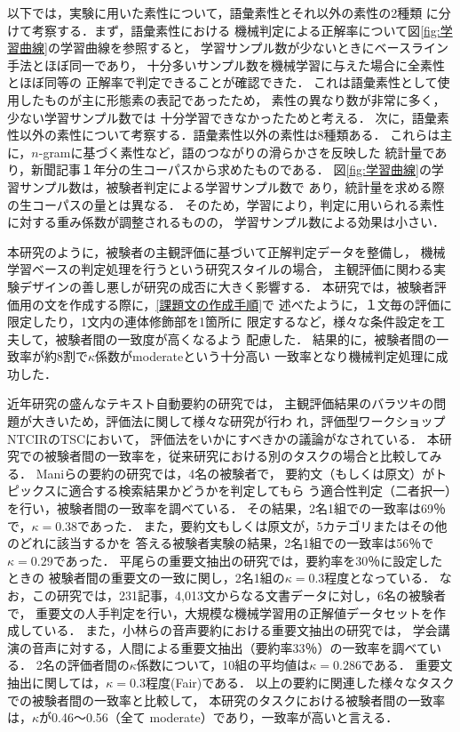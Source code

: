 \documentclass[japanese]{jnlp_1.3e}
\begin{document}
以下では，実験に用いた素性について，語彙素性とそれ以外の素性の2種類
に分けて考察する．まず，語彙素性における
機械判定による正解率について図\ref{fig:学習曲線}の学習曲線を参照すると，
学習サンプル数が少ないときにベースライン手法とほぼ同一であり，
十分多いサンプル数を機械学習に与えた場合に全素性とほぼ同等の
正解率で判定できることが確認できた．
これは語彙素性として使用したものが主に形態素の表記であったため，
素性の異なり数が非常に多く，少ない学習サンプル数では
十分学習できなかったためと考える．
次に，語彙素性以外の素性について考察する．語彙素性以外の素性は8種類ある．
これらは主に，$n$-gramに基づく素性など，語のつながりの滑らかさを反映した
統計量であり，新聞記事１年分の生コーパスから求めたものである．
図\ref{fig:学習曲線}の学習サンプル数は，被験者判定による学習サンプル数で
あり，統計量を求める際の生コーパスの量とは異なる．
そのため，学習により，判定に用いられる素性に対する重み係数が調整されるものの，
学習サンプル数による効果は小さい．

本研究のように，被験者の主観評価に基づいて正解判定データを整備し，
機械学習ベースの判定処理を行うという研究スタイルの場合，
主観評価に関わる実験デザインの善し悪しが研究の成否に大きく影響する．
本研究では，被験者評価用の文を作成する際に，\ref{課題文の作成手順}で
述べたように，１文毎の評価に限定したり，1文内の連体修飾部を1箇所に
限定するなど，様々な条件設定を工夫して，被験者間の一致度が高くなるよう
配慮した．
結果的に，被験者間の一致率が約8割で$\kappa$係数がmoderateという十分高い
一致率となり機械判定処理に成功した．

近年研究の盛んなテキスト自動要約の研究では，
主観評価結果のバラツキの問題が大きいため，評価法に関して様々な研究が行わ
れ\cite{難波}，評価型ワークショップNTCIRのTSCにおいて，
評価法をいかにすべきかの議論がなされている\cite{NTCIR}．
本研究での被験者間の一致率を，従来研究における別のタスクの場合と比較してみる．
Maniらの要約の研究\cite{Mani99}では，4名の被験者で，
要約文（もしくは原文）がトピックスに適合する検索結果かどうかを判定してもら
う適合性判定（二者択一）を行い，被験者間の一致率を調べている．
その結果，2名1組での一致率は69{\kern0pt}％で，$\kappa=0.38$であった．
また，要約文もしくは原文が，5カテゴリまたはその他のどれに該当するかを
答える被験者実験の結果，2名1組での一致率は56{\kern0pt}％で$\kappa=0.29$であった．
平尾らの重要文抽出の研究\cite{平尾}では，要約率を30{\kern0pt}％に設定したときの
被験者間の重要文の一致に関し，2名1組の$\kappa=0.3$程度となっている．
なお，この研究では，231記事，4,013文からなる文書データに対し，6名の被験者で，
重要文の人手判定を行い，大規模な機械学習用の正解値データセットを作成している．
また，小林らの音声要約における重要文抽出の研究\cite{小林}では，
学会講演の音声に対する，人間による重要文抽出（要約率33{\kern0pt}％）の一致率を調べている．
2名の評価者間の$\kappa$係数について，10組の平均値は$\kappa=0.286$である．
重要文抽出に関しては，$\kappa=0.3$程度(Fair)である．
以上の要約に関連した様々なタスクでの被験者間の一致率と比較して，
本研究のタスクにおける被験者間の一致率は，$\kappa$が0.46〜0.56（全て
moderate）であり，一致率が高いと言える．
\end{document}
